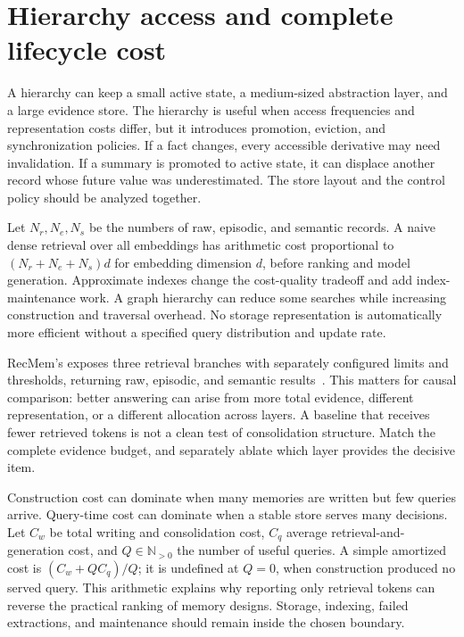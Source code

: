 \section{Hierarchy access and complete lifecycle cost}\label{sec:C14:hierarchy}
A hierarchy can keep a small active state, a medium-sized abstraction layer, and a large evidence store. The hierarchy is useful when access frequencies and representation costs differ, but it introduces promotion, eviction, and synchronization policies. If a fact changes, every accessible derivative may need invalidation. If a summary is promoted to active state, it can displace another record whose future value was underestimated. The store layout and the control policy should be analyzed together.

Let $N_r,N_e,N_s$ be the numbers of raw, episodic, and semantic records. A naive dense retrieval over all embeddings has arithmetic cost proportional to $(N_r+N_e+N_s)d$ for embedding dimension $d$, before ranking and model generation. Approximate indexes change the cost-quality tradeoff and add index-maintenance work. A graph hierarchy can reduce some searches while increasing construction and traversal overhead. No storage representation is automatically more efficient without a specified query distribution and update rate.

RecMem's  exposes three retrieval branches with separately configured limits and thresholds, returning raw, episodic, and semantic results~\cite{repo_recmem2026}. This matters for causal comparison: better answering can arise from more total evidence, different representation, or a different allocation across layers. A baseline that receives fewer retrieved tokens is not a clean test of consolidation structure. Match the complete evidence budget, and separately ablate which layer provides the decisive item.

Construction cost can dominate when many memories are written but few queries arrive. Query-time cost can dominate when a stable store serves many decisions. Let $C_w$ be total writing and consolidation cost, $C_q$ average retrieval-and-generation cost, and $Q\in\mathbb N_{>0}$ the number of useful queries. A simple amortized cost is $(C_w+QC_q)/Q$; it is undefined at $Q=0$, when construction produced no served query. This arithmetic explains why reporting only retrieval tokens can reverse the practical ranking of memory designs. Storage, indexing, failed extractions, and maintenance should remain inside the chosen boundary.

